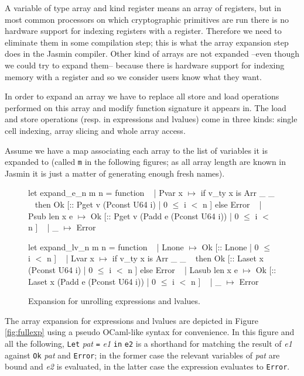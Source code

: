 \documentclass{article}
\begin{document}
A variable of type array and kind register means an array of registers, but in
most common processors on which cryptographic primitives are run there is no
hardware support for indexing registers with a register. Therefore we need to
eliminate them in some compilation step; this is what the array expansion step
does in the Jasmin compiler. Other kind of arrays are not expanded --even though
we could try to expand them-- because there is hardware support for indexing
memory with a register and so we consider users know what they want.

In order to expand an array we have to replace all store and load operations
performed on this array and modify function signature it appears in. The load
and store operations (resp. in expressions and lvalues) come in three kinds:
single cell indexing, array slicing and whole array access.

\smallskip

Assume we have a map associating each array to the list of variables it is
expanded to (called \texttt{m} in the following figures; as all array length are
known in Jasmin it is just a matter of generating enough fresh names).

\medskip

\begin{figure}[t]
\obeylines\obeyspaces\ttfamily%
let expand\_e\_n m n = function
~ | Pvar x       \(\mapsto\) if v\_ty x is Arr \_ \_
~   then Ok [:: Pget v (Pconst U64 i) | 0 \(\leq\) i \(<\) n ] else Error
~ | Psub len x e \(\mapsto\) Ok [:: Pget v (Padd e (Pconst U64 i)) | 0 \(\leq\) i \(<\) n ]
~ | \_ \(\mapsto\) Error
 
let expand\_lv\_n m n = function
~ | Lnone         \(\mapsto\) Ok [:: Lnone | 0 \(\leq\) i \(<\) n ]
~ | Lvar x        \(\mapsto\) if v\_ty x is Arr \_ \_
~   then Ok [:: Laset x (Pconst U64 i) | 0 \(\leq\) i \(<\) n ] else Error
~ | Lasub len x e \(\mapsto\) Ok [:: Laset x (Padd e (Pconst U64 i)) | 0 \(\leq\) i \(<\) n ]
~ | \_             \(\mapsto\) Error
\normalfont%
\caption{Expansion for unrolling expressions and lvalues.}\label{fig:unrexp}
\end{figure}

The array expansion for expressions and lvalues are depicted in Figure
\ref{fig:fullexp} using a pseudo OCaml-like syntax for convenience.
In this figure and all the following, \texttt{Let} \textit{pat} \texttt{=}
\textit{e1} \texttt{in} \texttt{e2} is a shorthand for matching the result of
\textit{e1} against \texttt{Ok} \textit{pat} and \texttt{Error}; in the former
case the relevant variables of \textit{pat} are bound and \textit{e2} is
evaluated, in the latter case the expression evaluates to \texttt{Error}.
\end{document}
